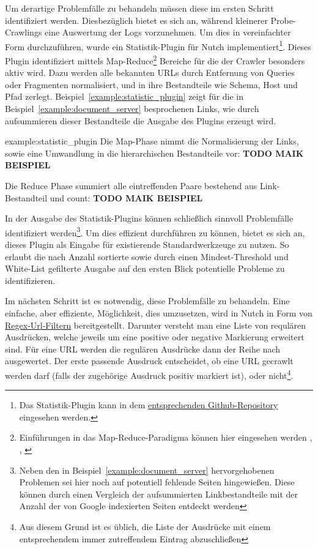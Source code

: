 Um derartige Problemfälle zu behandeln müssen diese im ersten Schritt identifiziert werden.
Diesbezüglich bietet es sich an, während kleinerer Probe-Crawlings eine Auswertung der Logs vorzunehmen.
Um dies in vereinfachter Form durchzuführen,
wurde ein Statistik-Plugin für Nutch implementiert\footnote{Das Statistik-Plugin kann in dem
\href{https://github.com/DaniloMorgado/url_statistic_plugin}{entsprechenden Github-Repository} eingesehen werden.}.
Dieses Plugin identifiziert mittels
Map-Reduce\footnote{Einführungen in das Map-Reduce-Paradigma können hier eingesehen werden \cite{}, \cite{}, \cite{}}
Bereiche für die der Crawler besonders aktiv wird.
Dazu werden alle bekannten URLs durch Entfernung
von Queries oder Fragmenten normalisiert, und in ihre Bestandteile wie Schema, Host und Pfad zerlegt.
Beispiel~\ref{example:statistic_plugin} zeigt für die in
Beispiel~\ref{example:document_server} besprochenen Links,
wie durch aufsummieren dieser Bestandteile die Ausgabe des Plugins erzeugt wird.

\begin{example}{example:statistic_plugin}
Die Map-Phase nimmt die Normalisierung der Links, sowie eine Umwandlung in die hierarchischen Bestandteile vor: \textbf{TODO MAIK BEISPIEL}

Die Reduce Phase summiert alle eintreffenden Paare bestehend aus Link-Bestandteil und count: \textbf{TODO MAIK BEISPIEL}
\end{example}
	
In der Ausgabe des Statistik-Plugins können schließlich sinnvoll Problemfälle identifiziert
werden\footnote{Neben den in Beispiel~\ref{example:document_server} hervorgehobenen Problemen sei hier noch auf potentiell fehlende Seiten hingewießen.
Diese können durch einen Vergleich der aufsummierten Linkbestandteile mit der Anzahl der von Google indexierten Seiten entdeckt werden}.
Um dies effizient durchführen zu können,
bietet es sich an, dieses Plugin als Eingabe für existierende Standardwerkzeuge zu nutzen.
So erlaubt die nach Anzahl sortierte sowie durch einen Mindest-Threshold und White-List gefilterte Ausgabe
auf den ersten Blick potentielle Probleme zu identifizieren.

Im nächsten Schritt ist es notwendig, diese Problemfälle zu behandeln.
Eine einfache, aber effiziente, Möglichkeit, dies umzusetzen, wird in Nutch in Form von \href{https://github.com/apache/nutch/blob/master/conf/regex-urlfilter.txt.template}{Regex-Url-Filtern} bereitgestellt.
Darunter versteht man eine Liste von requlären Ausdrücken, welche jeweils um eine positive oder negative Markierung erweitert sind.
Für eine URL werden die regulären Ausdrücke dann der Reihe nach ausgewertet.
Der erste passende Ausdruck entscheidet, ob eine URL gecrawlt werden darf (falls der zugehörige Ausdruck positiv markiert ist),
oder nicht\footnote{Aus diesem Grund ist es üblich, 
die Liste der Ausdrücke mit einem entsprechendem immer zutreffendem Eintrag abzuschließen}.


